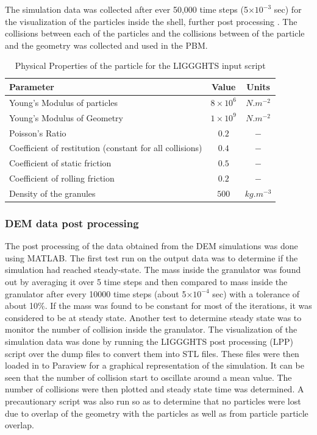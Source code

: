 \documentclass[preprint,11pt,authoryear]{elsarticle}
\begin{document}
The simulation data was collected after ever 50,000 time steps (5$\times 10^{-3}$ sec) 
for the visualization of the particles inside the shell, further post processing . The collisions 
between each of the particles and the collisions between of the particle and the geometry was 
collected and used in the PBM. 

\begin{table}
\caption{Physical Properties of the particle for the LIGGGHTS input script} 
\label{table:mthds_dem_input}
\begin{center}
\begin{tabular}{l|c|c}
\hline
\bf{Parameter} &\bf{Value} &\bf{Units}\\
\hline
Young's Modulus of particles  & $8 \times 10^{6}$ & $N.m^{-2}$\\
Young's Modulus of Geometry  & $1 \times 10^{9}$ & $N.m^{-2}$\\
Poisson's Ratio & $0.2$ & $-$\\
Coefficient of restitution (constant for all collisions) & $0.4$ & $-$\\
Coefficient of static friction & $0.5$ & $-$\\
Coefficient of rolling friction  & $0.2$ & $-$\\
Density of the granules & $500$ & $kg.m^{-3}$\\
\hline
\end{tabular}
\end{center}
\end{table}

\subsubsection{DEM data post processing}
The post processing of the data obtained from the DEM simulations was done using MATLAB. 
The first test run on the output data was to determine if the simulation had reached steady-state. The 
mass inside the granulator was found out by averaging it over 5 time steps and then compared to 
mass inside the granulator after every 10000 time steps (about 5$\times 10^{-4}$ sec) with a 
tolerance of about 10\%. If the mass was found to be constant for most of the iterations, it was 
considered to be at steady state. Another test to determine steady state was to monitor the number of 
collision inside the granulator. The visualization of the simulation data was done by running the 
LIGGGHTS post processing (LPP) script over the dump files to convert them into STL files. These 
files were then loaded in to Paraview \citep{henderson2004} for a graphical 
representation of the 
simulation. It can be seen that the number of collision start to oscillate around a mean value. The 
number of collisions were then plotted and steady state time was determined.
A precautionary script was also run so as to determine that no particles were lost due to overlap 
of the geometry with the particles as well as from particle particle overlap.
\end{document}
